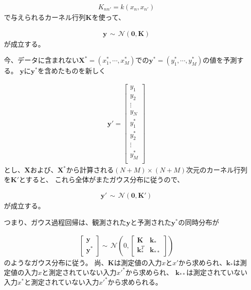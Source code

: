 \documentclass[titlepage]{jsreport}
\begin{document}
{{{\large
\begin{eqnarray}
K_{nn'}
=   k(x_n,x_{n'})\nonumber
\end{eqnarray}
\normalsize
で与えられるカーネル行列$\bm{K}$を使って、

\large
\begin{eqnarray}
\bm{y}
\,{\sim}\,{\mathcal{N}}(\bm{0},\bm{K})  \nonumber
\end{eqnarray}
\normalsize
が成立する。

今、データに含まれない$\bm{X}^*=(x_1^*,\cdots,x_M^*)$での$\bm{y}^*=(y_1^*,\cdots,y_M^*)$の値を予測する。
$\bm{y}$に$\bm{y}^*$を含めたものを新しく

\large
\begin{eqnarray}
\bm{y'}=  
    \left[
        \begin{array}{c}
        y_1\\
        y_2\\
        \vdots\\
        y_N\\
        y_1^*\\
        y_2^*\\
        \vdots\\
        y_M^*\\
        \end{array}
    \right] \nonumber
\end{eqnarray}
\normalsize
とし、$\bm{X}$および、$\bm{X}^*$から計算される$(N+M)×(N+M)$次元のカーネル行列を$\bm{K'}$とすると、
これら全体がまたガウス分布に従うので、

\large
\begin{eqnarray}
\bm{y'}
\,{\sim}\,{\mathcal{N}}(\bm{0},\bm{K'})  \nonumber
\end{eqnarray}
\normalsize
が成立する。

つまり、ガウス過程回帰は、観測された$\bm{y}$と予測された$\bm{y}^*$の同時分布が

\large
\begin{eqnarray}
    \left[
        \begin{array}{l}
            \bm{y} \\
            \bm{y}^* 
        \end{array}
    \right]
    {\sim}\,{\mathcal{N}}
    \left(0,
        \left[
            \begin{array}{cc}
                \bm{K} & \bm{k}_*\\    
                \bm{k}_*^T & \bm{k}_{**}
            \end{array}
        \right]
    \right) \label{eq:Gaussian-distribution}
\end{eqnarray}
\normalsize
のようなガウス分布に従う\cite{Gaussian-Processes-for-Machine-Learning}。
尚、$\bm{K}$は測定値の入力$x$と$x'$から求められ、$\bm{k}_*$は測定値の入力$x$と測定されていない入力$x'^*$から求められ、
$\bm{k}_{**}$は測定されていない入力$x^*$と測定されていない入力$x'^*$から求められる。

}}}
\end{document}
